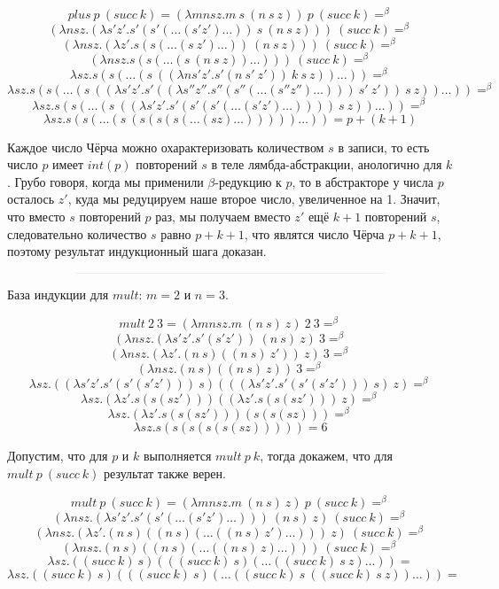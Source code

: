 \documentclass[a4paper,12pt]{article}
\theoremstyle{plain} %
\theoremstyle{definition} %
\theoremstyle{remark} %
\begin{document}
$$plus \ p \ (succ \ k) = (\lambda m n s z. m \ s \ (n \ s \ z)) \ p \ (succ \ k) =^{\beta}$$
$$(\lambda n s z. (\lambda s'z'. s'(s'(\dots(s'z')\dots)) \ s \ (n \ s \ z))) \ (succ \ k) =^{\beta}$$
$$(\lambda n s z. (\lambda z'. s(s(\dots(s \ z')\dots)) \ (n \ s \ z))) \ (succ \ k) =^{\beta}$$
$$(\lambda n s z. s(s(\dots(s \ (n \ s \ z))\dots))) \ (succ \ k) =^{\beta}$$
$$\lambda s z. s(s(\dots(s \ ((\lambda ns'z'. s'(n \ s' \ z')) \ k \ s \ z))\dots)) =^{\beta}$$
$$\lambda s z. s(s(\dots(s \ ((\lambda s'z'. s'((\lambda s''z''. s''(s''(\dots(s''z'')\dots))) \ s' \ z')) \ s \ z))\dots)) =^{\beta}$$
$$\lambda s z. s(s(\dots(s \ ((\lambda s'z'. s'(s'(s'(\dots(s'z')\dots)))) \ s \ z))\dots)) =^{\beta}$$
$$\lambda s z. s(s(\dots(s \ (s(s(s(\dots(sz)\dots)))))\dots)) = p + (k + 1)$$

Каждое число Чёрча можно охарактеризовать количеством $s$ в записи, то есть число $p$ имеет $int(p)$ повторений $s$ в теле лямбда-абстракции, анологично для $k$. Грубо говоря, когда мы применили $\beta$-редукцию к $p$, то в абстракторе у числа $p$ осталось $z'$, куда мы редуцируем наше второе число, увеличенное на 1. Значит, что вместо $s$ повторений $p$ раз, мы получаем вместо $z'$ ещё $k+1$ повторений $s$, следовательно количество $s$ равно $p+k+1$, что являтся число Чёрча $p + k + 1$, поэтому результат индукционный шага доказан.    

$$\rule{25em}{0.01em}$$

База индукции для $mult$: $m = 2$ и $n = 3$.

$$mult \ 2 \ 3 = (\lambda m n s z. m \ (n \ s) \ z) \ 2 \ 3 =^{\beta}$$
$$(\lambda n s z. (\lambda s'z'. s'(s'z')) \ (n \ s) \ z) \ 3 =^{\beta}$$
$$(\lambda n s z. (\lambda z'. (n \ s)((n \ s) \ z')) \ z) \ 3 =^{\beta}$$
$$(\lambda n s z. (n \ s)((n \ s) \ z)) \ 3 =^{\beta}$$
$$\lambda s z. ((\lambda s'z'.s'(s'(s'z'))) \ s)(((\lambda s'z'.s'(s'(s'z'))) \ s) \ z) =^{\beta}$$
$$\lambda s z. (\lambda z'.s(s(sz')))((\lambda z'.s(s(sz'))) \ z) =^{\beta}$$
$$\lambda s z. (\lambda z'.s(s(sz')))(s(s(sz))) =^{\beta}$$
$$\lambda s z. s(s(s(s(s(sz))))) = 6$$

Допустим, что для $p$ и $k$ выполняется $mult \ p \ k$, тогда докажем, что для $mult \ p \ (succ \ k)$ результат также верен.

$$mult \ p \ (succ \ k) = (\lambda m n s z. m \ (n \ s) \ z) \ p \ (succ \ k) =^{\beta}$$
$$(\lambda n s z. (\lambda s'z'.s'(s'(\dots(s'z')\dots))) \ (n \ s) \ z) \ (succ \ k) =^{\beta}$$
$$(\lambda n s z. (\lambda z'.(n \ s)((n \ s)(\dots((n \ s) \ z')\dots))) \ z) \ (succ \ k) =^{\beta}$$
$$(\lambda n s z. (n \ s)((n \ s)(\dots((n \ s) \ z)\dots))) \ (succ \ k) =^{\beta}$$
$$\lambda s z. ((succ \ k) \ s)(((succ \ k) \ s)(\dots((succ \ k) \ s \ z)\dots)) =$$
$$\lambda s z. ((succ \ k) \ s)(((succ \ k) \ s)(\dots((succ \ k) \ s \ ((succ \ k) \ s \ z))\dots)) =$$
\end{document}
